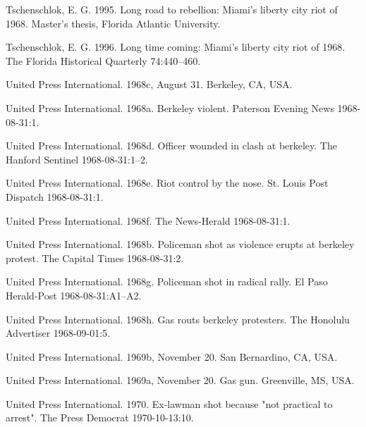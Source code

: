 \documentclass[
  11pt,
]{krantz}
\newlength{\cslhangindent}
\newenvironment{CSLReferences}[2] %
 {%
  \setlength{\parindent}{0pt}
  \ifodd #1 \everypar{\setlength{\hangindent}{\cslhangindent}}\ignorespaces\fi
  \ifnum #2 > 0
  \setlength{\parskip}{#2\baselineskip}
  \fi
 }%
 {}
\begin{document}
\begin{CSLReferences}{1}{0}
\leavevmode{}%
Tschenschlok, E. G. 1995. Long road to rebellion: Miami's liberty city riot of 1968. Master's thesis, Florida Atlantic University.

\leavevmode{}%
Tschenschlok, E. G. 1996. Long time coming: Miami's liberty city riot of 1968. The Florida Historical Quarterly 74:440--460.

\leavevmode{}%
United Press International. 1968c, August 31. Berkeley, CA, USA.

\leavevmode{}%
United Press International. 1968a. Berkeley violent. Paterson Evening News 1968-08-31:1.

\leavevmode{}%
United Press International. 1968d. Officer wounded in clash at berkeley. The Hanford Sentinel 1968-08-31:1--2.

\leavevmode{}%
United Press International. 1968e. Riot control by the nose. St. Louis Post Dispatch 1968-08-31:1.

\leavevmode{}%
United Press International. 1968f. The News-Herald 1968-08-31:1.

\leavevmode{}%
United Press International. 1968b. Policeman shot as violence erupts at berkeley protest. The Capital Times 1968-08-31:2.

\leavevmode{}%
United Press International. 1968g. Policeman shot in radical rally. El Paso Herald-Post 1968-08-31:A1--A2.

\leavevmode{}%
United Press International. 1968h. Gas routs berkeley protesters. The Honolulu Advertiser 1968-09-01:5.

\leavevmode{}%
United Press International. 1969b, November 20. San Bernardino, CA, USA.

\leavevmode{}%
United Press International. 1969a, November 20. Gas gun. Greenville, MS, USA.

\leavevmode{}%
United Press International. 1970. Ex-lawman shot because "not practical to arrest". The Press Democrat 1970-10-13:10.


\end{CSLReferences}
\end{document}
